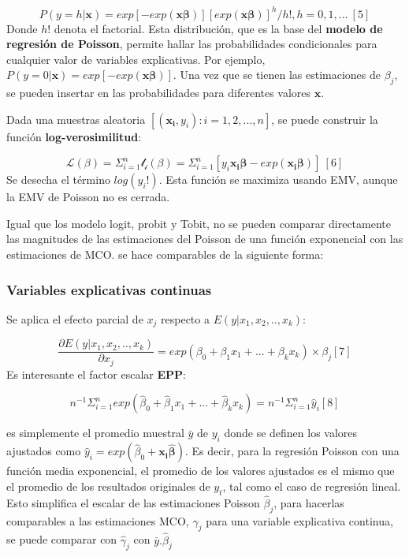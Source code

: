 \documentclass[
  letterpaper,
  DIV=11,
  numbers=noendperiod]{scrreprt}
\begin{document}
\[P(y=h|\mathbf{x})=exp[-exp(\mathbf{x\beta})][exp(\mathbf{x\beta})]^h/h!, h=0,1,...\ [5]\]
Donde \(h!\) denota el factorial. Esta distribución, que es la base del
\textbf{modelo de regresión de Poisson}, permite hallar las
probabilidades condicionales para cualquier valor de variables
explicativas. Por ejemplo,
\(P(y=0|\mathbf{x})=exp[-exp(\mathbf{x\beta})]\). Una vez que se tienen
las estimaciones de \(\beta_j\), se pueden insertar en las
probabilidades para diferentes valores \(\mathbf{x}\).

Dada una muestras aleatoria \([(\mathbf{x_i},y_i):i=1,2,...,n]\), se
puede construir la función \textbf{log-verosimilitud}:

\[\mathcal{L(\beta)}=\Sigma_{i=1}^n\mathcal{l_i(\beta)}=\Sigma_{i=1}^n[y_i\mathbf{x_i\beta}-exp(\mathbf{x_i\beta})]\ [6]\]
Se desecha el término \(log(y_i!)\). Esta función se maximiza usando
EMV, aunque la EMV de Poisson no es cerrada.

Igual que los modelo logit, probit y Tobit, no se pueden comparar
directamente las magnitudes de las estimaciones del Poisson de una
función exponencial con las estimaciones de MCO. se hace comparables de
la siguiente forma:

\subsubsection{Variables explicativas
continuas}\label{variables-explicativas-continuas}

Se aplica el efecto parcial de \(x_j\) respecto a
\(E(y|x_1,x_2,..,x_k)\):

\[\frac{\partial E(y|x_1,x_2,..,x_k)}{\partial x_j}=exp(\beta_0+\beta_1x_1+...+\beta_kx_k)\times \beta_j [7]\]
Es interesante el factor escalar \textbf{EPP}:

\[n^{-1}\Sigma_{i=1}^nexp(\hat{\beta}_0+\hat{\beta}_1x_1+...+\hat{\beta}_kx_k)=n^{-1}\Sigma_{i=1}^n\hat{y}_i [8]\]

es simplemente el promedio muestral \(\bar{y}\) de \(y_i\) donde se
definen los valores ajustados como
\(\widehat{y}_i=exp(\hat{\beta}_0+\mathbf{x_i\hat{\beta}})\). Es decir,
para la regresión Poisson con una función media exponencial, el promedio
de los valores ajustados es el mismo que el promedio de los resultados
originales de \(y_t\), tal como el caso de regresión lineal. Esto
simplifica el escalar de las estimaciones Poisson \(\widehat{\beta}_j\),
para hacerlas comparables a las estimaciones MCO, \(\widehat{\gamma}_j\)
para una variable explicativa continua, se puede comparar con
\(\widehat{\gamma}_j\) con \(\bar{y}.\widehat{\beta}_{j}\)
\end{document}
